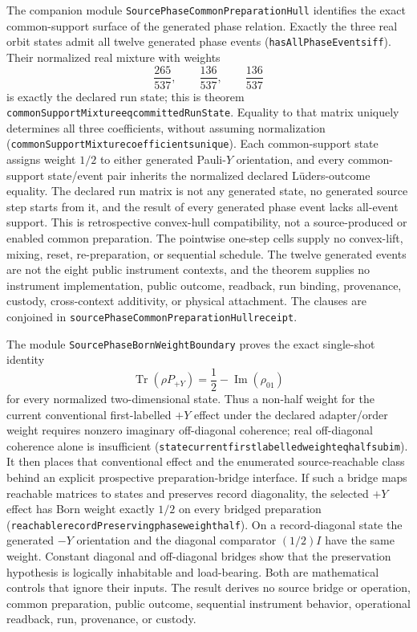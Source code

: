 \documentclass[11pt]{article}
\renewcommand{\_}{\textunderscore\allowbreak}
\theoremstyle{remark}
\begin{document}
The companion module \texttt{SourcePhaseCommonPreparationHull} identifies
the exact common-support surface of the generated phase relation. Exactly the
three real orbit states admit all twelve generated phase events
(\texttt{hasAllPhaseEvents\_iff}). Their normalized real mixture with weights
\[
  \frac{265}{537},\qquad \frac{136}{537},\qquad \frac{136}{537}
\]
is exactly the declared run state; this is theorem
\texttt{commonSupportMixture\_eq\_committedRunState}. Equality to that matrix
uniquely determines all three coefficients, without assuming normalization
(\texttt{commonSupportMixture\_coefficients\_unique}). Each common-support
state assigns weight $1/2$ to either generated Pauli-$Y$ orientation, and
every common-support state/event pair inherits the normalized declared
L\"uders-outcome equality. The declared run matrix is not any generated state,
no generated source step starts from it, and the result of every generated
phase event lacks all-event support. This is retrospective convex-hull
compatibility, not a source-produced or enabled common preparation. The
pointwise one-step cells supply no convex-lift, mixing, reset,
re-preparation, or sequential schedule. The twelve generated events are not
the eight public instrument contexts, and the theorem supplies no instrument
implementation, public outcome, readback, run binding, provenance, custody,
cross-context additivity, or physical attachment. The
clauses are conjoined in
\texttt{sourcePhaseCommonPreparationHull\_receipt}.

The module \texttt{SourcePhaseBornWeightBoundary} proves the exact
single-shot identity
\[
  \operatorname{Tr}(\rho P_{+Y})=\frac12-\operatorname{Im}(\rho_{01})
\]
for every normalized two-dimensional state. Thus a non-half weight for the
current conventional first-labelled $+Y$ effect under the declared adapter/order
weight requires nonzero imaginary off-diagonal coherence; real off-diagonal
coherence alone is insufficient
(\texttt{state\_current\_first\_labelled\_weight\_eq\_half\_sub\_im}). It then places
that conventional effect and the enumerated source-reachable class behind an
explicit prospective preparation-bridge interface. If such a bridge maps
reachable matrices to states and preserves record diagonality, the selected
$+Y$ effect has Born weight exactly $1/2$ on every bridged preparation
(\texttt{reachable\_recordPreserving\_phase\_weight\_half}). On a
record-diagonal state the generated $-Y$ orientation and the diagonal
comparator $(1/2)I$ have the same weight. Constant diagonal and off-diagonal
bridges show that the preservation hypothesis is logically inhabitable and
load-bearing. Both are mathematical controls that ignore their inputs. The
result derives no source bridge or operation, common preparation, public
outcome, sequential instrument behavior, operational readback, run,
provenance, or custody.
\end{document}
